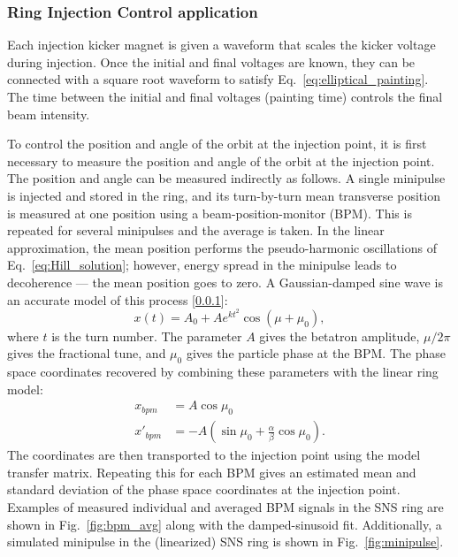 \subsubsection{Ring Injection Control application}

Each injection kicker magnet is given a waveform that scales the kicker voltage during injection. Once the initial and final voltages are known, they can be connected with a square root waveform to satisfy Eq.~\eqref{eq:elliptical_painting}. The time between the initial and final voltages (painting time) controls the final beam intensity. 

To control the position and angle of the orbit at the injection point, it is first necessary to measure the position and angle of the orbit at the injection point. The position and angle can be measured indirectly as follows. A single minipulse is injected and stored in the ring, and its turn-by-turn mean transverse position is measured at one position using a beam-position-monitor (BPM). This is repeated for several minipulses and the average is taken. In the linear approximation, the mean position performs the pseudo-harmonic oscillations of Eq.~\eqref{eq:Hill_solution}; however, energy spread in the minipulse leads to decoherence — the mean position goes to zero. A Gaussian-damped sine wave is an accurate model of this process [\ref{}]:
%
\begin{equation}\label{eq:damped_sinusoid}
    x(t) = A_0 + A e^{kt^2} \cos{\left(\mu + \mu_0\right)},
\end{equation}
%
where $t$ is the turn number. The parameter $A$ gives the betatron amplitude, $\mu / 2\pi$ gives the fractional tune, and $\mu_0$ gives the particle phase at the BPM. The phase space coordinates recovered by combining these parameters with the linear ring model:
%
\begin{equation}
\begin{aligned}
    x_{bpm} &= A \cos\mu_0 \\ 
    x'_{bpm} &= -A\left({\sin\mu_0 + \frac{\alpha}{\beta}\cos\mu_0}\right).
\end{aligned}
\end{equation}
%
The coordinates are then transported to the injection point using the model transfer matrix. Repeating this for each BPM gives an estimated mean and standard deviation of the phase space coordinates at the injection point. Examples of measured individual and averaged BPM signals in the SNS ring are shown in Fig.~\ref{fig:bpm_avg} along with the damped-sinusoid fit. Additionally, a simulated minipulse in the (linearized) SNS ring is shown in Fig.~\ref{fig:minipulse}.
